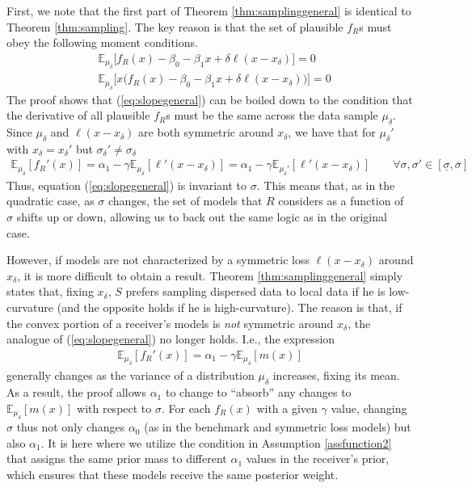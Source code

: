 \documentclass[11pt,dvipsnames]{article}
\begin{document}
\begin{appendix}
First, we note that the first part of Theorem \ref{thm:samplinggeneral} is identical to Theorem \ref{thm:sampling}.
The key reason is that the set of plausible $f_R$s must obey the following moment conditions.
\begin{align}
&\mathbb{E}_{\mu_\delta}\big[f_R(x)-\beta_0-\beta_1 x + \delta \ell(x-x_\delta)\big] =0
\label{eq:interceptgeneral}
\\
&\mathbb{E}_{\mu_\delta}\big[x\big(f_R(x)-\beta_0-\beta_1 x+\delta \ell(x-x_\delta) \big)\big] =0 \label{eq:slopegeneral}
\end{align}
The proof shows that (\ref{eq:slopegeneral}) can be boiled down to the condition that the derivative of all plausible $f_R$s must be the same across the data sample $\mu_\delta$.
Since $\mu_\delta$ and $\ell(x-x_\delta)$ are both symmetric around $x_\delta$, we have that for $\mu_\delta '$ with $x_\delta = x_\delta'$ but $\sigma_\delta' \neq\sigma_\delta$
\begin{align*}
\mathbb{E}_{\mu_\delta}[f_R'(x)]
= \alpha_1-\gamma\mathbb{E}_{\mu_\delta}[\ell'(x-x_\delta)]
=\alpha_1-\gamma\mathbb{E}_{\mu_\delta'}[\ell'(x-x_\delta)] 
\qquad \forall \sigma,\sigma' \in [\underline{\sigma},\overline{\sigma}]
\end{align*}
Thus, equation (\ref{eq:slopegeneral}) is invariant to $\sigma$.
This means that, as in the quadratic case, as $\sigma$ changes, the set of models that $R$ considers as a function of $\sigma$ shifts up or down, allowing us to back out the same logic as in the original case.

However, if models are not characterized by a symmetric loss $\ell(x-x_\delta)$ around $x_\delta$, it is more difficult to obtain a result.
Theorem \ref{thm:samplinggeneral} simply states that, fixing $x_\delta$, $S$ prefers sampling dispersed data to local data if he is low-curvature (and the opposite holds if he is high-curvature).
The reason is that, if the convex portion of a receiver's models is \emph{not} symmetric around $x_\delta$, the analogue of (\ref{eq:slopegeneral}) no longer holds.
I.e., the expression
\begin{align*}
\mathbb{E}_{\mu_\delta}[f_R'(x)]
=
\alpha_1-\gamma\mathbb{E}_{\mu_\delta}[m(x)]
\end{align*}
generally changes as the variance of a distribution $\mu_\delta$ increases, fixing its mean.
As a result, the proof allows $\alpha_1$ to change to ``absorb'' any changes to $\mathbb{E}_{\mu_\delta}[m(x)]$ with respect to $\sigma$.
For each $f_R(x)$ with a given $\gamma$ value, changing $\sigma$ thus not only changes $\alpha_0$ (as in the benchmark and symmetric loss models) but also $\alpha_1$.
It is here where we utilize the condition in Assumption \ref{assfunction2} that assigns the same prior mass to different $\alpha_1$ values in the receiver's prior, which ensures that these models receive the same posterior weight.


\end{appendix}
\end{document}
